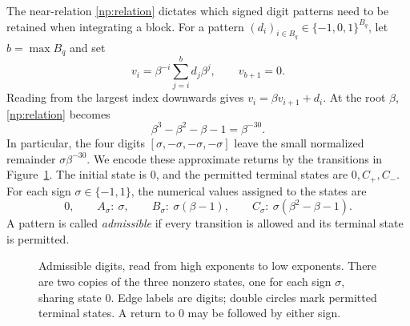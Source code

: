 The near-relation \eqref{np:relation} dictates which signed digit patterns
need to be retained when integrating a block. For a pattern
\((d_i)_{i\in B_q}\in\{-1,0,1\}^{B_q}\), let \(b=\max B_q\) and set
\[
 v_i=\beta^{-i}\sum_{j=i}^{b}d_j\beta^j,\qquad
 v_{b+1}=0.
\]
Reading from the largest index downwards gives
\(v_i=\beta v_{i+1}+d_i\). At the root \(\beta\),
\eqref{np:relation} becomes
\begin{equation}
 \beta^3-\beta^2-\beta-1=\beta^{-30}.
 \label{np:near-cubic}
\end{equation}
In particular, the four digits
\([\sigma,-\sigma,-\sigma,-\sigma]\) leave the small normalized remainder
\(\sigma\beta^{-30}\). We encode these approximate returns by the
transitions in Figure~\ref{np:automaton}. The initial
state is \(0\), and the permitted terminal states are \(0,C_+,C_-\).
For each sign \(\sigma\in\{-1,1\}\), the numerical values assigned to the
states are
\begin{equation}
 0,\qquad A_\sigma:\ \sigma,\qquad
 B_\sigma:\ \sigma(\beta-1),\qquad
 C_\sigma:\ \sigma(\beta^2-\beta-1).
 \label{np:state-values}
\end{equation}
A pattern is called \emph{admissible} if every transition is allowed and
its terminal state is permitted.

\begin{figure}[ht]
 \centering
 \caption{Admissible digits, read from high exponents to low exponents.
 There are two copies of the three nonzero states, one for each sign
 \(\sigma\), sharing state \(0\). Edge labels are digits; double circles
 mark permitted terminal states. A return to \(0\) may be followed by
 either sign.}
 \label{np:automaton}
\end{figure}

